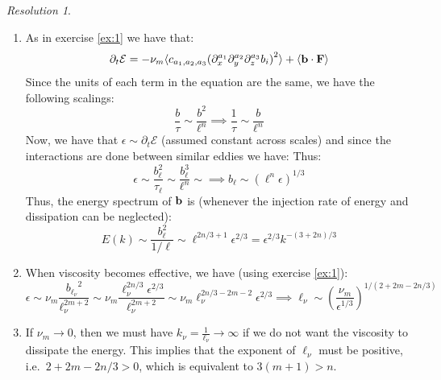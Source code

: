 \documentclass[10pt,a4paper]{article}
\theoremstyle{definition}
\theoremstyle{remark}
\newtheorem*{res}{Resolution}
\begin{document}
\begin{res}\hfill
  \begin{enumerate}
    \item As in exercise \ref{ex:1} we have that:
          $$
            \partial_t \mathcal{E} = -\nu_m \langle c_{a_1,a_2,a_3}{(\partial_x^{a_1} \partial_y^{a_2} \partial_z^{a_3} b_i)}^2 \rangle + \langle \boldsymbol{\mathrm{b}} \cdot \boldsymbol{\mathrm{F}} \rangle
          $$
          Since the units of each term in the equation are the same, we have the following scalings:
          $$
            \frac{b}{\tau} \sim \frac{b^2}{\ell^n} \implies \frac{1}{\tau} \sim \frac{b}{\ell^n}
          $$
          Now, we have that $\epsilon\sim \partial_t\mathcal{E}$ (assumed constant across scales) and since the interactions are done between similar eddies we have:
          Thus:
          $$
            \epsilon\sim \frac{b_\ell^2}{\tau_\ell} \sim \frac{b_\ell^3}{\ell^n} \sim \implies b_\ell \sim \left(\ell^{n}\epsilon\right)^{1/3}
          $$
          Thus, the energy spectrum of $\boldsymbol{\mathrm{b}}$ is (whenever the injection rate of energy and dissipation can be neglected):
          $$
            E(k) \sim \frac{b_\ell^2}{1/\ell} \sim \ell^{2n/3+1} \epsilon^{2/3}=\epsilon^{2/3} k^{-(3+2n)/3}
          $$
    \item When viscosity becomes effective, we have (using exercise \ref{ex:1}):
          $$
            \epsilon \sim \nu_m \frac{{b_{\ell_\nu}}^2}{\ell_\nu^{2m+2}}  \sim \nu_m \frac{\ell_\nu^{2n/3} \epsilon^{2/3}}{\ell_\nu^{2m+2}}  \sim \nu_m \ell_\nu^{2n/3-2m-2} \epsilon^{2/3}\implies \ell_\nu \sim \left(\frac{\nu_m}{\epsilon^{1/3}}\right)^{1/(2+2m-2n/3)}
          $$
    \item If $\nu_m \to 0$, then we must have $k_\nu=\frac{1}{\ell_\nu} \to \infty$ if we do not want the viscosity to dissipate the energy. This implies that the exponent of $\ell_\nu$ must be positive, i.e.\ $2+2m-2n/3>0$, which is equivalent to $3(m+1)>n$.
  \end{enumerate}
\end{res}
\end{document}
